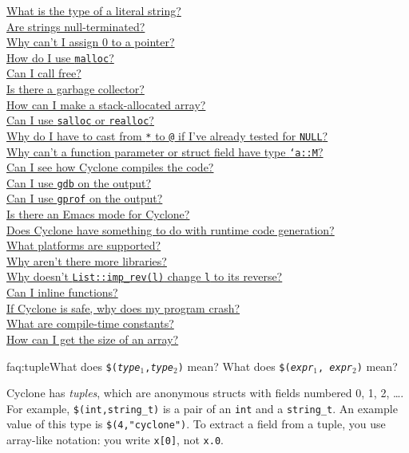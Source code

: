 \begin{small}
\hyperlink{faq:litstring}{What is the type of a literal string?}\\
\hyperlink{faq:nullterminate}{Are strings null-terminated?}\\
\hyperlink{faq:zero}{Why can't I assign 0 to a pointer?}\\
\hyperlink{faq:malloc}{How do I use \texttt{malloc}?}\\
\hyperlink{faq:free}{Can I call free?}\\
\hyperlink{faq:gc}{Is there a garbage collector?}\\
\hyperlink{faq:stackalloc}{How can I make a stack-allocated array?}\\
\hyperlink{faq:realloc}{Can I use \texttt{salloc} or \texttt{realloc}?}\\
\hyperlink{faq:nullcast}{Why do I have to cast from \texttt{*} to \texttt{@} if I've already tested for \texttt{NULL}?}\\
\hyperlink{faq:memkind}{Why can't a function parameter or struct field have type \texttt{`a::M}?}\\
\hyperlink{faq:compile}{Can I see how Cyclone compiles the code?}\\
\hyperlink{faq:gdb}{Can I use \texttt{gdb} on the output?}\\
\hyperlink{faq:gprof}{Can I use \texttt{gprof} on the output?}\\
\hyperlink{faq:emacs}{Is there an Emacs mode for Cyclone?}\\
\hyperlink{faq:rtcg}{Does Cyclone have something to do with runtime code generation?}\\
\hyperlink{faq:platforms}{What platforms are supported?}\\
\hyperlink{faq:libs}{Why aren't there more libraries?}\\
\hyperlink{faq:imprev}{Why doesn't \texttt{List::imp_rev(l)} change \texttt{l} to its reverse?}\\
\hyperlink{faq:inline}{Can I inline functions?}\\
\hyperlink{faq:crash}{If Cyclone is safe, why does my program crash?}\\
\hyperlink{faq:ctc}{What are compile-time constants?}\\
\hyperlink{faq:arraysize}{How can I get the size of an array?}
\end{small}
\fi

\begin{faqa}{faq:tuple}{What does \texttt{\$({\it type}$_1$,{\it type}$_2$)} mean?  What does \texttt{\$({\it expr}$_1$, {\it expr}$_2$)} mean?}

Cyclone has \emph{tuples}, which are anonymous structs with fields
numbered 0, 1, 2, \ldots.  For example, \texttt{\$(int,string_t)} is a
pair of an \texttt{int} and a \texttt{string_t}.  An example value of
this type is \texttt{\$(4,"cyclone")}.  To extract a field from a
tuple, you use array-like notation: you write \texttt{x[0]}, not
\texttt{x.0}.
\end{faqa}

